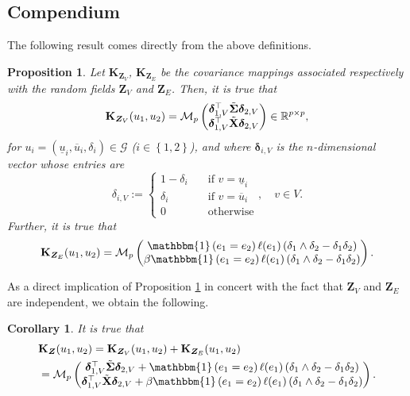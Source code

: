 \documentclass[12pt]{article}
\theoremstyle{plain}
\newtheorem{proposition}{Proposition}
\newtheorem{corollary}{Corollary}
\theoremstyle{remark}
\newcommand{\round}[1]{\left( #1 \right)}
\newcommand{\curly}[1]{\left\{ #1 \right\}}
\newcommand{\R}[0]{\mathbb{R}}
\newcommand{\indOne}[0]{\mathbbm{1}}
\newcommand{\ul}[1]{\underline{#1}}
\newcommand{\ol}[1]{\overline{#1}}
\newcommand{\Mv}[3]{\mathcal{M}_{#1}\begin{pmatrix}
	#2\\
	#3
\end{pmatrix}}
\newcommand{\dVec}[1]{{\bm{#1}}}            %
\newcommand{\latMatr}[1]{\mathbf{#1}}          %
\newcommand{\grMatr}[1]{{\boldsymbol{#1}}}   %
\newcommand{\rVec}[1]{{\bm{#1}}}            %
\begin{document}
\subsection{Compendium}
    \label{ssec:compendium}
    The following result comes directly from the above definitions.
    \begin{proposition}
        \label{prop:explicit_K_ZV_and_K_ZE}
        Let ${\latMatr{K}}_{\rVec{Z}_V}$, ${\latMatr{K}}_{\rVec{Z}_E}$ be the covariance mappings associated respectively with the {random fields} $\rVec{Z}_V$ and $\rVec{Z}_E$. Then, it is true that 
        \begin{equation}
            {\latMatr{K}}_{\rVec{Z}_V}(u_1,u_2)=\Mv{p}{\dVec{\delta}_{{1,V}}^\top \Tilde {\grMatr{\Sigma}}\dVec{\delta}_{{2,V}}}{\dVec \delta_{{1,V}}^\top \Tilde {\latMatr{X}}\dVec \delta_{{2,V}}} \in \R^{p\times p},
        \end{equation}
        for $u_i=(\ul u_i, \ol u_i, \delta_i)\in \mathcal G$ ($i\in\curly{1,2}$), and where $\dVec{\delta}_{{i,V}}$ is the $n$-dimensional vector whose entries are 
        \begin{equation}
            \label{eq:delta_i}
            {\delta}_{{i,{V}}}:=\begin{cases}
                1-\delta_i \quad &\text{if }v=\ul u_i\\
                \delta_i \quad &\text{if }v=\ol u_i\\
                0 \quad &\text{otherwise}  
            \end{cases}, \quad  v\in V.
        \end{equation}
        Further, it is true that 
        \begin{equation*}
            {\latMatr{K}}_{\rVec{Z}_E}(u_1,u_2)=\Mv{p}{\indOne\round{e_1=e_2}\ell(e_1)\round{\delta_1 \wedge \delta_2 - \delta_1 \delta_2}}{\beta \indOne\round{e_1=e_2}\ell(e_1)\round{\delta_1 \wedge \delta_2 - \delta_1 \delta_2}}.
        \end{equation*}
    \end{proposition}
    As a direct implication of Proposition \ref{prop:explicit_K_ZV_and_K_ZE} in concert with the fact that $\rVec{Z}_V$ and $\rVec{Z}_E$ are independent, we obtain the following.
    \begin{corollary}
        \label{cor:explicitExprK_Z}
        It is true that
        \begin{align}
            \label{eq:covZ_full}
            &{\latMatr{K}}_{\rVec{Z}}(u_1,u_2)={\latMatr{K}}_{\rVec{Z}_V}(u_1,u_2)+{\latMatr{K}}_{\rVec{Z}_E}(u_1,u_2)\nonumber\\
            &=\Mv{p}{\boldsymbol{\delta}_{{1,V}}^\top \Tilde {\grMatr{\Sigma}}\dVec{\delta}_{{2,V}} + \indOne\round{e_1=e_2}\ell(e_1)\round{\delta_1 \wedge \delta_2 - \delta_1 \delta_2}}{\dVec \delta_{{1,V}}^\top \Tilde {\latMatr{X}}\dVec \delta_{{2,V}} + \beta \indOne\round{e_1=e_2}\ell(e_1)\round{\delta_1 \wedge \delta_2 - \delta_1 \delta_2}}.
        \end{align} 
    \end{corollary}
\end{document}

